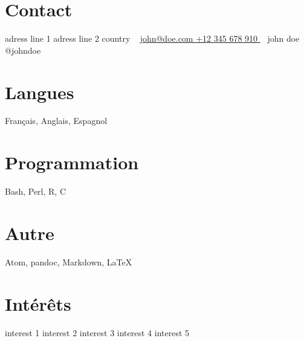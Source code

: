 \documentclass[]{friggeri-cv}
\begin{document}
\setlength{\textheight}{700pt}



\begin{aside}
	\setlength{\fboxsep}{0pt}%
	\setlength{\fboxrule}{2pt}%
	\section{Contact \faHome}
		adress line 1
		adress line 2
		country
		~
		\href{mailto:john@doe.com}{john@doe.com \faInbox}
		\href{tel:+12345678910}{+12 345 678 910 \faPhone}
		~
		john doe \faLinkedin
		@johndoe \faTwitter
	\section{Langues \faGlobe}
		Français, Anglais, Espagnol
	\section{Programmation \faLaptop}
		Bash, Perl, R, C
	\section{Autre \faTerminal}
		Atom, pandoc, Markdown, \LaTeX
	\section{Intérêts \faHeart}
		interest 1
		interest 2
		interest 3
		interest 4
		interest 5
\end{aside}

\end{document}
